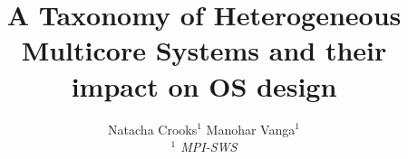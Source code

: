 

\newif \ifDraft\Drafttrue

\ifDraft
  \newcommand{\Comment}[1]{\textbf{\textsl{#1}}}
\else
  \newcommand{\Comment}[1]{\relax}
\fi

\newcommand{\gernot}[1]{\Comment{#1 [gernot]}}


\title{\textbf{
A Taxonomy of Heterogeneous Multicore Systems and their impact on OS design}
}

\author{
Natacha Crooks$^1$ \quad
Manohar Vanga$^1$
\\ \emph{$^1$ MPI-SWS}
}
\date{\vspace{-8pt}}




\maketitle





%
%



%
\fontsize{8}{8.2}
\selectfont


\normalsize


